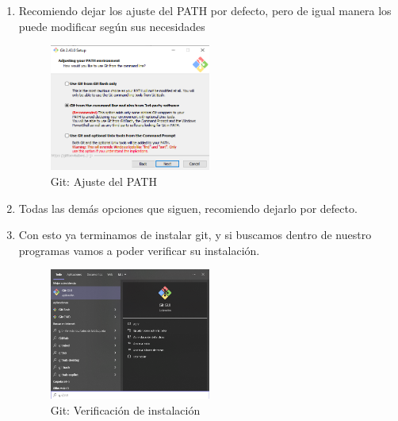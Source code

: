 \begin{enumerate}
	\item Recomiendo dejar los ajuste del PATH por defecto, pero de igual manera los puede modificar según sus necesidades
	\begin{figure}[!h]
		\centering
		\includegraphics[width=0.5\textwidth]{01Instalacion/Imagenes/windows/instalacion09.png}
		\caption{Git: Ajuste del PATH}
		\label{fig:gitPATH}
	\end{figure}
	\newpage
	\item Todas las demás opciones que siguen, recomiendo dejarlo por defecto.
	\item Con esto ya terminamos de instalar git, y si buscamos dentro de nuestro programas vamos a poder verificar su instalación.
	\begin{figure}[!h]
		\centering
		\includegraphics[width=0.5\textwidth]{01Instalacion/Imagenes/windows/instalacion10.png}
		\caption{Git: Verificación de instalación}
		\label{fig:gitInstaladoWindows}
	\end{figure}
\end{enumerate}